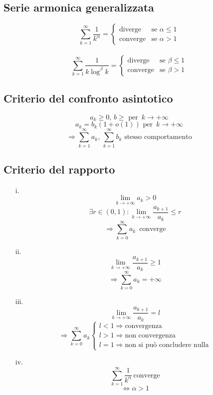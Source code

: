 \documentclass[a4paper,12pt]{report}
\theoremstyle{mystyle}
\begin{document}
\subsection{Serie armonica generalizzata}
\[\sum_{k=1}^\infty \frac{1}{k^\alpha} = \begin{cases}
        \text{diverge}  & \text{se } \alpha \leq 1 \\
        \text{converge} & \text{se } \alpha > 1
    \end{cases} \]\\
\[\sum_{k=1}^\infty \frac{1}{k \log^\beta k} = \begin{cases}
        \text{diverge}  & \text{se } \beta \leq 1 \\
        \text{converge} & \text{se } \beta > 1
    \end{cases} \]


\subsection{Criterio del confronto asintotico}
\[a_k \geq 0,\,b\geq \text{ per } \, k \rightarrow +\infty \]
\[a_k = b_k(1+o(1)) \text{ per } \, k \rightarrow +\infty\]
\[\Rightarrow \sum_{k=1}^\infty a_k,\, \sum_{k=1}^\infty b_k  \text{ stesso comportamento}\]




\subsection{Criterio del rapporto}
\begin{enumerate}
    \item[i.] \[\lim_{k \rightarrow + \infty} a_k > 0\]
        \[\exists r \in (0,1): \lim_{k \rightarrow + \infty} \frac{a_{k+1}}{a_k} \leq r \]
        \[
            \Rightarrow \sum_{k=0}^\infty a_k \, \text{ converge}
        \]

    \item[ii.] \[\lim_{k \rightarrow +\infty} \frac{a_{k+1}}{a_k} \geq 1\]
        \[
            \Rightarrow \sum_{k=0}^\infty a_k = + \infty
        \]

    \item[iii.] \[\lim_{k\rightarrow +\infty}\frac{a_{k+1}}{a_k} = l \]
        \[
            \Rightarrow \sum_{k=0}^\infty a_k
            \begin{cases}
                l<1 \Rightarrow \text{convergenza}     \\
                l>1 \Rightarrow \text{non convergenza} \\
                l=1 \Rightarrow \text{non si può concludere nulla}
            \end{cases}
        \]

    \item[iv.] \[\sum_{k=1}^\infty \frac{1}{k^\alpha} \, \text{converge}\] 
        \[\Leftrightarrow \alpha > 1
        \]
\end{enumerate}
\end{document}
